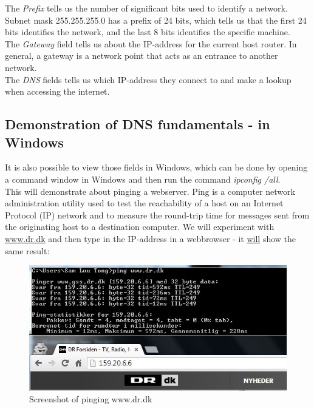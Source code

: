 The \textit{Prefix} tells us the number of significant bits used to identify a network. Subnet mask 255.255.255.0 has a prefix of 24 bits, which tells us that the first 24 bits identifies the network, and the last 8 bits identifies the specific machine. \\

The \textit{Gateway} field tells us about the IP-address for the current host router. In general, a gateway is a network point that acts as an entrance to another network. \\

The \textit{DNS} fields tells us which IP-address they connect to and make a lookup when accessing the internet.

\subsection{Demonstration of DNS fundamentals - in Windows}

It is also possible to view those fields in Windows, which can be done by opening a command window in Windows and then run the command \textit{ipconfig /all}. \\

This will demonstrate about pinging a webserver. Ping is a computer network administration utility used to test the reachability of a host on an Internet Protocol (IP) network and to measure the round-trip time for messages sent from the originating host to a destination computer.
We will experiment with \url{www.dr.dk} and then type in the IP-address in a webbrowser - it \underline{will} show the same result:

\begin{figure}[ht!]
\centering
\includegraphics[width=150mm]{img/ping.png}
\caption{Screenshot of pinging www.dr.dk}
\label{ping}
\end{figure}

